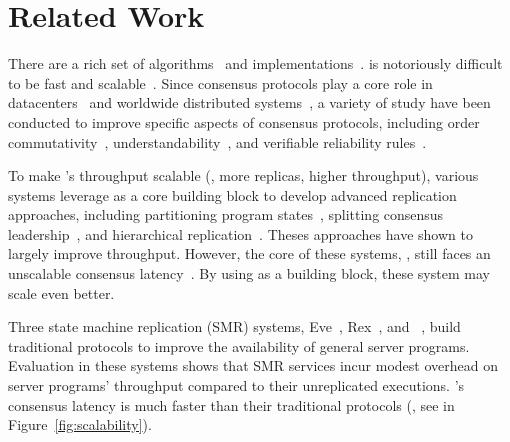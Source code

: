 \section{Related Work} \label{sec:related}


 There are a rich set of
\paxos algorithms~\cite{paxos:practical,paxos,paxos:simple,paxos:complex,
epaxos:sosp13} and 
implementations~\cite{paxos:live,paxos:practical,chubby:osdi,crane:sosp15}. 
\paxos is notoriously difficult to be fast and 
scalable~\cite{ellis:thesis,manos:hotdep10,scatter:sosp11}. Since consensus 
protocols play a core role in datacenters~\cite{matei:hotcloud11, mesos:nsdi11, 
datacenter:os} and worldwide 
distributed systems~\cite{spanner:osdi12,mencius:osdi08}, a variety of study 
have been conducted to improve specific aspects of consensus protocols, 
including order commutativity~\cite{epaxos:sosp13}, 
understandability~\cite{raft:usenix14,paxos}, and verifiable reliability 
rules~\cite{modist:nsdi09,demeter:sosp11}.



To make \paxos's throughput scalable (\ie, more replicas, higher throughput), 
various systems leverage \paxos as a core building block to develop advanced 
replication approaches, including partitioning program 
states~\cite{scatter:sosp11,ssmr:dsn14}, splitting consensus 
leadership~\cite{mencius:osdi08,spaxos:srds12}, and hierarchical 
replication~\cite{manos:hotdep10,scatter:sosp11}. Theses approaches have shown 
to largely improve throughput. However, the core of these systems, 
\paxos, still faces an unscalable consensus 
latency~\cite{ellis:thesis,scatter:sosp11,manos:hotdep10}. By using \xxx as a 
building block, these system may scale even better.




Three state machine replication (SMR) systems, Eve~\cite{eve:osdi12}, 
Rex~\cite{rex:eurosys14}, and \crane~\cite{crane:sosp15}, build traditional 
\paxos protocols to improve the availability of general server programs. 
Evaluation in these systems shows that SMR services incur modest overhead on 
server programs' throughput compared to their unreplicated executions. \xxx's 
consensus latency is much faster than their traditional 
protocols (\eg, see \crane in Figure~\ref{fig:scalability}).

